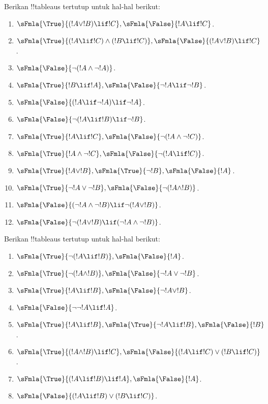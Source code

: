 \documentclass[../../../include/open-logic-section]{subfiles}
\begin{document}
\begin{prob}
Berikan !!{tableau}s tertutup untuk hal-hal berikut:
\begin{enumerate}
\item $\sFmla{\True}{(!A \lor !B) \lif !C}, \sFmla{\False}{!A \lif !C}$.
\item $\sFmla{\True}{(!A \lif !C) \land (!B \lif !C)}, \sFmla{\False}{(!A \lor !B) \lif !C}$.
\item $\sFmla{\False}{\lnot(!A \land \lnot !A)}$.
\item $\sFmla{\True}{!B \lif !A}, \sFmla{\False}{\lnot !A \lif \lnot !B}$.
\item $\sFmla{\False}{(!A \lif \lnot !A) \lif \lnot !A}$.
\item $\sFmla{\False}{\lnot(!A \lif !B) \lif \lnot !B}$.
\item $\sFmla{\True}{!A \lif !C}, \sFmla{\False}{\lnot (!A \land \lnot !C)}$.
\item $\sFmla{\True}{!A \land \lnot !C}, \sFmla{\False}{\lnot (!A \lif !C)}$.
\item $\sFmla{\True}{!A \lor !B}, \sFmla{\True}{\lnot !B}, \sFmla{\False}{!A}$.
\item $\sFmla{\True}{\lnot !A \lor \lnot !B}, \sFmla{\False}{\lnot(!A \land !B)}$.
\item $\sFmla{\False}{(\lnot !A \land \lnot !B) \lif\lnot(!A \lor !B)}$.
\item $\sFmla{\False}{\lnot(!A \lor !B) \lif (\lnot !A \land \lnot !B)}$.
\end{enumerate}
\end{prob}

\begin{prob}
Berikan !!{tableau}s tertutup untuk hal-hal berikut:
\begin{enumerate}
\item $\sFmla{\True}{\lnot(!A \lif !B)}, \sFmla{\False}{!A}$.
\item $\sFmla{\True}{\lnot(!A \land !B)}, \sFmla{\False}{\lnot !A \lor \lnot !B}$.
\item $\sFmla{\True}{!A \lif !B}, \sFmla{\False}{\lnot !A \lor !B}$.
\item $\sFmla{\False}{\lnot \lnot !A \lif !A}$.
\item $\sFmla{\True}{!A \lif !B}, \sFmla{\True}{\lnot !A \lif !B}, \sFmla{\False}{!B}$.
\item $\sFmla{\True}{(!A \land !B) \lif !C}, \sFmla{\False}{(!A \lif !C) \lor (!B \lif !C)}$.
\item $\sFmla{\True}{(!A \lif !B) \lif !A}, \sFmla{\False}{!A}$.
\item $\sFmla{\False}{(!A \lif !B) \lor (!B \lif !C)}$.
\end{enumerate}
\end{prob}
\end{document}
